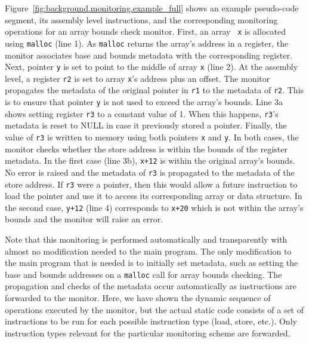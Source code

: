 Figure~\ref{fig:background.monitoring.example_full} shows an example
pseudo-code segment, its assembly level instructions, and the corresponding
monitoring operations for an array bounds check monitor.  First, an array {\tt
x} is allocated using {\tt malloc} (line 1).  As {\tt malloc} returns the
array's address in a register, the monitor associates base and bounds metadata
with the corresponding register.  Next, pointer {\tt y} is set to point to the
middle of array {\tt x} (line 2).  At the assembly level, a register {\tt r2}
is set to array {\tt x}'s address plus an offset.  The monitor propagates the
metadata of the original pointer in {\tt r1} to the metadata of {\tt r2}. This
is to ensure that pointer {\tt y} is not used to exceed the array's bounds.
Line 3a shows setting register {\tt r3} to a constant value of 1.  When this
happens, {\tt r3}'s metadata is reset to NULL in case it previously stored a
pointer.  Finally, the value of {\tt r3} is written to memory using both
pointers {\tt x} and {\tt y}.  In both cases, the monitor checks whether the
store address is within the bounds of the register metadata. In the first case
(line 3b), {\tt x+12} is within the original array's bounds. No error is raised
and the metadata of {\tt r3} is propagated to the metadata of the store
address. If {\tt r3} were a pointer, then this would allow a future instruction
to load the pointer and use it to access its corresponding array or data
structure. In the second case, {\tt y+12} (line 4) corresponds to {\tt x+20}
which is not within the array's bounds and the monitor will raise an error. 

Note that this monitoring is performed automatically and transparently with
almost no modification needed to the main program. The only modification to the
main program that is needed is to initially set metadata, such as setting the
base and bounds addresses on a {\tt malloc} call for array bounds checking.
The propagation and checks of the metadata occur automatically as instructions
are forwarded to the monitor.  Here, we have shown the dynamic sequence of
operations executed by the monitor, but the actual static code consists of a
set of instructions to be run for each possible instruction type (load, store,
etc.). Only instruction types relevant for the particular monitoring scheme are
forwarded.



